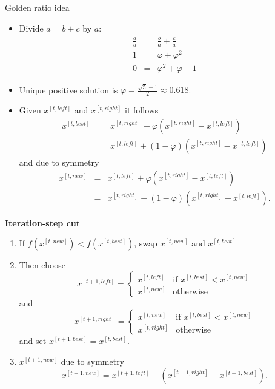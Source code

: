 \begin{vbframe}{Golden ratio idea}
\begin{itemize}
\item Divide $a = b + c$ by $a$:
\begin{eqnarray*}
\frac{a}{a} &=& \frac{b}{a} + \frac{c}{a} \\
1 &=& \varphi + \varphi^2 \\
0 &=& \varphi^2 + \varphi - 1
\end{eqnarray*}
\item Unique positive solution is $\varphi = \frac{\sqrt{5}-1}{2} \approx 0.618$.

\framebreak

\item Given $x^{[t, left]}$ and $x^{[t, right]}$ it follows
\begin{eqnarray*}
x^{[t, best]}&=&x^{[t, right]}-\varphi(x^{[t, right]}-x^{[t, left]})\\
&=&x^{[t, left]}+(1-\varphi)(x^{[t, right]}-x^{[t, left]})
\end{eqnarray*}
and due to symmetry
\begin{eqnarray*}
x^{[t, new]}&=& x^{[t, left]}+\varphi(x^{[t, right]}-x^{[t, left]})\\ &=& x^{[t, right]}-(1-\varphi)(x^{[t, right]}-x^{[t, left]}).
\end{eqnarray*}
\end{itemize}

\framebreak

\textbf{Iteration-step cut} \\
\begin{enumerate}
\item If $f(x^{[t, new]}) < f(x^{[t, best]})$, swap $x^{[t, new]}$ and $x^{[t, best]}$
\item Then choose
$$x^{[t + 1, left]} = \begin{cases}
x^{[t, left]} & \text{if } x^{[t, best]}<x^{[t, new]} \\
x^{[t, new]} & \text{otherwise}
\end{cases}$$
and
$$x^{[t + 1, right]} = \begin{cases}
x^{[t, new]} & \text{if } x^{[t, best]}<x^{[t, new]} \\
x^{[t, right]} & \text{otherwise}
\end{cases}$$
and set $x^{[t + 1, best]}=x^{[t, best]}$.
\item $x^{[t + 1, new]}$ due to symmetry
$$
x^{[t + 1, new]}=x^{[t + 1, left]}-(x^{[t + 1, right]}-x^{[t + 1, best]}).
$$
\end{enumerate}
%

\end{vbframe}

